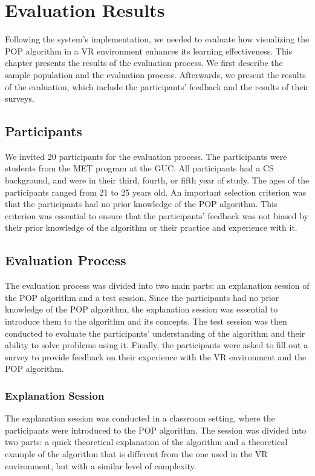 \chapter{Evaluation Results}

Following the system's implementation, we needed to evaluate how visualizing the \acf{POP} algorithm in a \ac{VR} environment enhances its learning effectiveness. This chapter presents the results of the evaluation process. We first describe the sample population and the evaluation process. Afterwards, we present the results of the evaluation, which include the participants' feedback and the results of their surveys.

\section{Participants}

We invited 20 participants for the evaluation process. The participants were students from the \acf{MET} program at the \acf{GUC}. All participants had a \ac{CS} background, and were in their third, fourth, or fifth year of study. The ages of the participants ranged from 21 to 25 years old. An important selection criterion was that the participants had no prior knowledge of the \ac{POP} algorithm. This criterion was essential to ensure that the participants' feedback was not biased by their prior knowledge of the algorithm or their practice and experience with it.

\section{Evaluation Process}

The evaluation process was divided into two main parts: an explanation session of the \ac{POP} algorithm and a test session. Since the participants had no prior knowledge of the \ac{POP} algorithm, the explanation session was essential to introduce them to the algorithm and its concepts. The test session was then conducted to evaluate the participants' understanding of the algorithm and their ability to solve problems using it. Finally, the participants were asked to fill out a survey to provide feedback on their experience with the \ac{VR} environment and the \ac{POP} algorithm.

\subsection{Explanation Session}
The explanation session was conducted in a classroom setting, where the participants were introduced to the \ac{POP} algorithm. The session was divided into two parts: a quick theoretical explanation of the algorithm and a theoretical example of the algorithm that is different from the one used in the \ac{VR} environment, but with a similar level of complexity.

